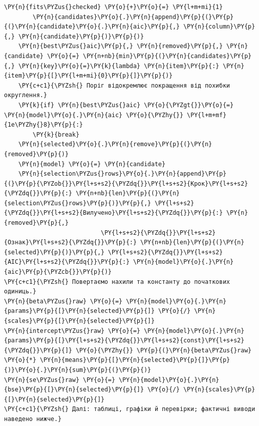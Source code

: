 \begin{Verbatim}[commandchars=\\\{\}]
        \PY{n}{fits\PYZus{}checked} \PY{o}{+}\PY{o}{=} \PY{l+m+mi}{1}
        \PY{n}{candidates}\PY{o}{.}\PY{n}{append}\PY{p}{(}\PY{p}{(}\PY{n}{candidate}\PY{o}{.}\PY{n}{aic}\PY{p}{,} \PY{n}{column}\PY{p}{,} \PY{n}{candidate}\PY{p}{)}\PY{p}{)}
    \PY{n}{best\PYZus{}aic}\PY{p}{,} \PY{n}{removed}\PY{p}{,} \PY{n}{candidate} \PY{o}{=} \PY{n+nb}{min}\PY{p}{(}\PY{n}{candidates}\PY{p}{,} \PY{n}{key}\PY{o}{=}\PY{k}{lambda} \PY{n}{item}\PY{p}{:} \PY{n}{item}\PY{p}{[}\PY{l+m+mi}{0}\PY{p}{]}\PY{p}{)}
    \PY{c+c1}{\PYZsh{} Поріг відокремлює покращення від похибки округлення.}
    \PY{k}{if} \PY{n}{best\PYZus{}aic} \PY{o}{\PYZgt{}}\PY{o}{=} \PY{n}{model}\PY{o}{.}\PY{n}{aic} \PY{o}{\PYZhy{}} \PY{l+m+mf}{1e\PYZhy{}8}\PY{p}{:}
        \PY{k}{break}
    \PY{n}{selected}\PY{o}{.}\PY{n}{remove}\PY{p}{(}\PY{n}{removed}\PY{p}{)}
    \PY{n}{model} \PY{o}{=} \PY{n}{candidate}
    \PY{n}{selection\PYZus{}rows}\PY{o}{.}\PY{n}{append}\PY{p}{(}\PY{p}{\PYZob{}}\PY{l+s+s2}{\PYZdq{}}\PY{l+s+s2}{Крок}\PY{l+s+s2}{\PYZdq{}}\PY{p}{:} \PY{n+nb}{len}\PY{p}{(}\PY{n}{selection\PYZus{}rows}\PY{p}{)}\PY{p}{,} \PY{l+s+s2}{\PYZdq{}}\PY{l+s+s2}{Вилучено}\PY{l+s+s2}{\PYZdq{}}\PY{p}{:} \PY{n}{removed}\PY{p}{,}
                           \PY{l+s+s2}{\PYZdq{}}\PY{l+s+s2}{Ознак}\PY{l+s+s2}{\PYZdq{}}\PY{p}{:} \PY{n+nb}{len}\PY{p}{(}\PY{n}{selected}\PY{p}{)}\PY{p}{,} \PY{l+s+s2}{\PYZdq{}}\PY{l+s+s2}{AIC}\PY{l+s+s2}{\PYZdq{}}\PY{p}{:} \PY{n}{model}\PY{o}{.}\PY{n}{aic}\PY{p}{\PYZcb{}}\PY{p}{)}
\PY{c+c1}{\PYZsh{} Повертаємо нахили та константу до початкових одиниць.}
\PY{n}{beta\PYZus{}raw} \PY{o}{=} \PY{n}{model}\PY{o}{.}\PY{n}{params}\PY{p}{[}\PY{n}{selected}\PY{p}{]} \PY{o}{/} \PY{n}{scales}\PY{p}{[}\PY{n}{selected}\PY{p}{]}
\PY{n}{intercept\PYZus{}raw} \PY{o}{=} \PY{n}{model}\PY{o}{.}\PY{n}{params}\PY{p}{[}\PY{l+s+s2}{\PYZdq{}}\PY{l+s+s2}{const}\PY{l+s+s2}{\PYZdq{}}\PY{p}{]} \PY{o}{\PYZhy{}} \PY{p}{(}\PY{n}{beta\PYZus{}raw} \PY{o}{*} \PY{n}{means}\PY{p}{[}\PY{n}{selected}\PY{p}{]}\PY{p}{)}\PY{o}{.}\PY{n}{sum}\PY{p}{(}\PY{p}{)}
\PY{n}{se\PYZus{}raw} \PY{o}{=} \PY{n}{model}\PY{o}{.}\PY{n}{bse}\PY{p}{[}\PY{n}{selected}\PY{p}{]} \PY{o}{/} \PY{n}{scales}\PY{p}{[}\PY{n}{selected}\PY{p}{]}
\PY{c+c1}{\PYZsh{} Далі: таблиці, графіки й перевірки; фактичні виводи наведено нижче.}
\end{Verbatim}
